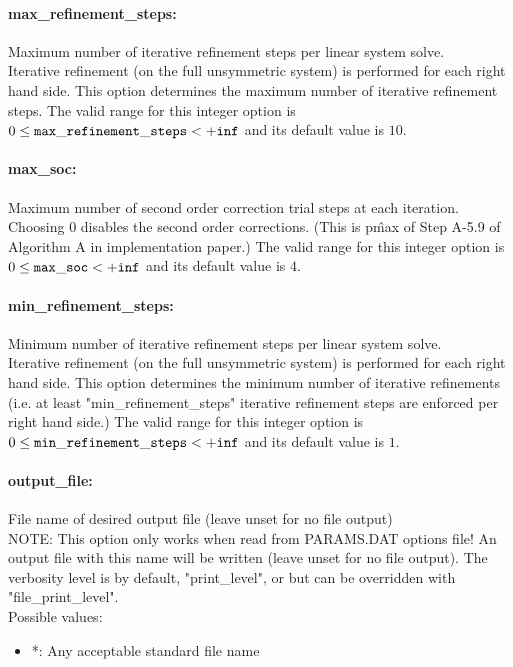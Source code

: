 \documentclass[letter,10pt]{article}
\begin{document}
\paragraph{max\_refinement\_steps:} Maximum number of iterative refinement steps per linear system solve. $\;$ \\
 Iterative refinement (on the full unsymmetric
system) is performed for each right hand side. 
This option determines the maximum number of
iterative refinement steps. The valid range for this integer option is
$0 \le {\tt max\_refinement\_steps } <  {\tt +inf}$
and its default value is $10$.


\paragraph{max\_soc:} Maximum number of second order correction trial steps at each iteration. $\;$ \\
 Choosing 0 disables the second order corrections.
(This is p\^{max} of Step A-5.9 of Algorithm A in
implementation paper.) The valid range for this integer option is
$0 \le {\tt max\_soc } <  {\tt +inf}$
and its default value is $4$.


\paragraph{min\_refinement\_steps:} Minimum number of iterative refinement steps per linear system solve. $\;$ \\
 Iterative refinement (on the full unsymmetric
system) is performed for each right hand side. 
This option determines the minimum number of
iterative refinements (i.e. at least
"min\_refinement\_steps" iterative refinement
steps are enforced per right hand side.) The valid range for this integer option is
$0 \le {\tt min\_refinement\_steps } <  {\tt +inf}$
and its default value is $1$.


\paragraph{output\_file:} File name of desired output file (leave unset for no file output) $\;$ \\
 NOTE: This option only works when read from
PARAMS.DAT options file! An output file with this
name will be written (leave unset for no file
output).  The verbosity level is by default,
"print\_level", or but can be overridden with
"file\_print\_level".\\ 
Possible values:
\begin{itemize}
   \item *: Any acceptable standard file name
\end{itemize}
\end{document}
